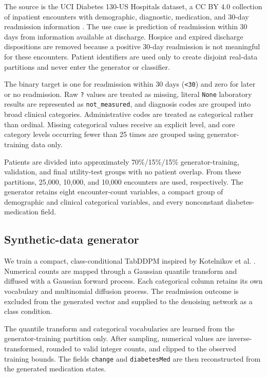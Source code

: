 \documentclass[11pt]{article}
\begin{document}
The source is the UCI Diabetes 130-US Hospitals dataset, a CC BY 4.0 collection of
inpatient encounters with demographic, diagnostic, medication, and 30-day readmission
information \cite{uci-diabetes}. The use case is prediction of readmission within 30 days
from information available at discharge. Hospice and expired discharge dispositions are
removed because a positive 30-day readmission is not meaningful for these encounters.
Patient identifiers are used only to create disjoint real-data partitions and never enter
the generator or classifier.

The binary target is one for readmission within 30 days (\texttt{<30}) and zero for later
or no readmission. Raw \texttt{?} values are treated as missing, literal \texttt{None}
laboratory results are represented as \texttt{not\_measured}, and diagnosis codes are
grouped into broad clinical categories. Administrative codes are treated as categorical
rather than ordinal. Missing categorical values receive an explicit level, and core
category levels occurring fewer than 25 times are grouped using generator-training data
only.

Patients are divided into approximately 70\%/15\%/15\% generator-training, validation, and final
utility-test groups with no patient overlap. From these partitions, 25,000, 10,000, and
10,000 encounters are used, respectively. The generator retains eight encounter-count
variables, a compact group of demographic and clinical categorical variables, and every
nonconstant diabetes-medication field.

\subsection{Synthetic-data generator}

We train a compact, class-conditional TabDDPM inspired by Kotelnikov et al.
\cite{tabddpm}. Numerical counts are mapped through a Gaussian quantile transform and
diffused with a Gaussian forward process. Each categorical column retains its own
vocabulary and multinomial diffusion process. The readmission outcome is excluded from
the generated vector and supplied to the denoising network as a class condition.

The quantile transform and categorical vocabularies are learned from the generator-training
partition only. After sampling, numerical values are inverse-transformed, rounded to valid
integer counts, and clipped to the observed training bounds. The fields \texttt{change}
and \texttt{diabetesMed} are then reconstructed from the generated medication states.
\end{document}
